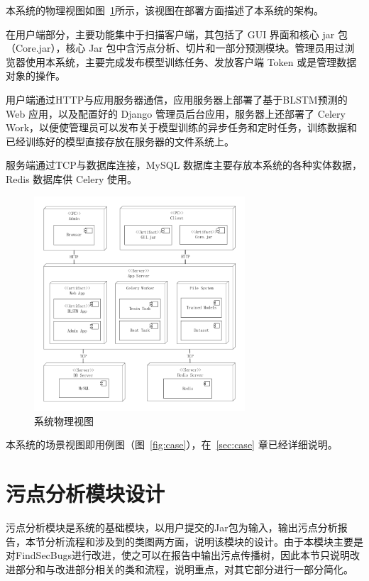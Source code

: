 本系统的物理视图如图~\ref{view:physical}所示，该视图在部署方面描述了本系统的架构。

在用户端部分，主要功能集中于扫描客户端，其包括了 GUI 界面和核心 jar 包（Core.jar），核心 Jar 包中含污点分析、切片和一部分预测模块。管理员用过浏览器使用本系统，主要完成发布模型训练任务、发放客户端 Token 或是管理数据对象的操作。

用户端通过HTTP与应用服务器通信，应用服务器上部署了基于BLSTM预测的 Web 应用，以及配置好的 Django 管理员后台应用，服务器上还部署了 Celery Work，以便使管理员可以发布关于模型训练的异步任务和定时任务，训练数据和已经训练好的模型直接存放在服务器的文件系统上。

服务端通过TCP与数据库连接，MySQL 数据库主要存放本系统的各种实体数据，Redis 数据库供 Celery 使用。
\begin{figure}[!htb]
	\centering
	\includegraphics[width=0.7\textwidth]{FIGs/chapter3/viewphysical.pdf}
	\caption{系统物理视图}\label{view:physical}
\end{figure}

本系统的场景视图即用例图（图~\ref{fig:case}），在~\ref{sec:case} 章已经详细说明。

\section{污点分析模块设计}

污点分析模块是系统的基础模块，以用户提交的Jar包为输入，输出污点分析报告，本节分析流程和涉及到的类图两方面，说明该模块的设计。由于本模块主要是对FindSecBugs进行改进，使之可以在报告中输出污点传播树，因此本节只说明改进部分和与改进部分相关的类和流程，说明重点，对其它部分进行一部分简化。\\


